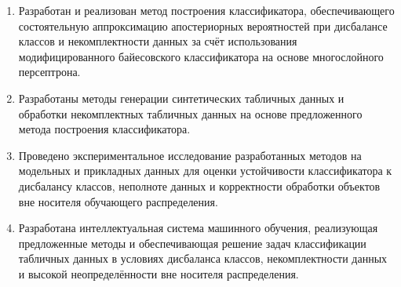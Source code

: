 
\begin{enumerate}
    \item Разработан и реализован метод построения классификатора, обеспечивающего состоятельную аппроксимацию апостериорных вероятностей при дисбалансе классов и некомплектности данных за счёт использования модифицированного байесовского классификатора на основе многослойного персептрона.
    \item Разработаны методы генерации синтетических табличных данных и обработки некомплектных табличных данных на основе предложенного метода построения классификатора.
    \item Проведено экспериментальное исследование разработанных методов на модельных и прикладных данных для оценки устойчивости классификатора к дисбалансу классов, неполноте данных и корректности обработки объектов вне носителя обучающего распределения.
    \item Разработана интеллектуальная система машинного обучения, реализующая предложенные методы и обеспечивающая решение задач классификации табличных данных в условиях дисбаланса классов, некомплектности данных и высокой неопределённости вне носителя распределения.
\end{enumerate}
